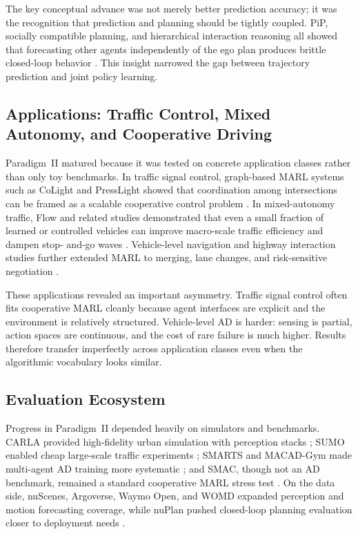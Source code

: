 \documentclass[12pt, a4paper]{article}
\begin{document}
The key conceptual advance was not merely better prediction accuracy; it was the
recognition that prediction and planning should be tightly coupled. PiP,
socially compatible planning, and hierarchical interaction reasoning all showed
that forecasting other agents independently of the ego plan produces brittle
closed-loop behavior \cite{song2020pip,sadigh2016planning,fisac2019hierarchical,schwarting2021deep}. This insight narrowed the gap between trajectory prediction and joint policy learning.

\subsection{Applications: Traffic Control, Mixed Autonomy, and Cooperative Driving}

Paradigm~II matured because it was tested on concrete application classes rather
than only toy benchmarks. In traffic signal control, graph-based MARL systems
such as CoLight and PressLight showed that coordination among intersections can
be framed as a scalable cooperative control problem \cite{wei2019colight,wei2019presslight,zheng2019learning,wang2018urban}. In mixed-autonomy traffic,
Flow and related studies demonstrated that even a small fraction of learned or
controlled vehicles can improve macro-scale traffic efficiency and dampen stop-
and-go waves \cite{wu2017flow,stern2018dissipation,talebpour2016influence}.
Vehicle-level navigation and highway interaction studies further extended MARL to
merging, lane changes, and risk-sensitive negotiation
\cite{isele2018navigating,hubmann2018automated,shalev2016safe,palanisamy2020multi}.

These applications revealed an important asymmetry. Traffic signal control often
fits cooperative MARL cleanly because agent interfaces are explicit and the
environment is relatively structured. Vehicle-level AD is harder: sensing is
partial, action spaces are continuous, and the cost of rare failure is much
higher. Results therefore transfer imperfectly across application classes even
when the algorithmic vocabulary looks similar.

\subsection{Evaluation Ecosystem}

Progress in Paradigm~II depended heavily on simulators and benchmarks. CARLA
provided high-fidelity urban simulation with perception stacks
\cite{dosovitskiy2017carlaopenurbandriving}; SUMO enabled cheap large-scale traffic
experiments \cite{krajzewicz2012recent}; SMARTS and MACAD-Gym made multi-agent AD
training more systematic \cite{zhou2020smarts,palanisamy2020multi}; and SMAC,
though not an AD benchmark, remained a standard cooperative MARL stress test
\cite{samvelyan2019starcraft,papoudakis2021benchmarking}. On the data side,
nuScenes, Argoverse, Waymo Open, and WOMD expanded perception and motion
forecasting coverage, while nuPlan pushed closed-loop planning evaluation closer
to deployment needs \cite{caesar2020nuscenes,chang2019argoverse,waymo2021open,ettinger2021large,caesar2021nuplan}.
\end{document}
